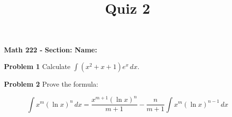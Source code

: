 \documentclass{article}
\title{Quiz 2}
\begin{document}
\begin{center}\makeatletter %
{ \bf Math 222 - \@title }
{ \bf \hfill Section: \underline{\hspace{2cm}} \hfill Name: \underline{\hspace{5cm}} }
\end{center}

{\bf Problem 1} Calculate $\displaystyle \int \left(x^2 + x + 1\right) e^x\,dx$.

\vfill

{\bf Problem 2} Prove the formula:

\[ \int x^m \left(\ln x\right)^n\,dx = \frac{x^{m+1}\left(\ln x\right)^n}{m+1} - \frac{n}{m+1}\int x^m \left(\ln x\right)^{n-1}\,dx \]

\vfill
\end{document}
